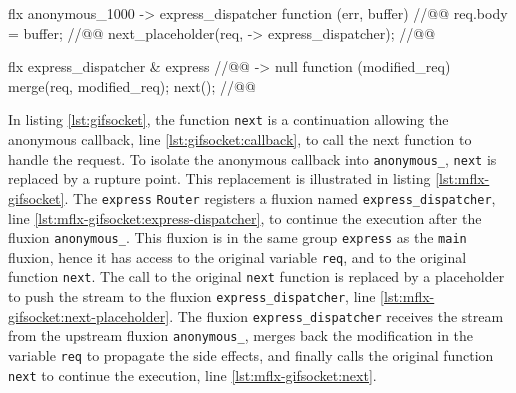 


\begin{code}[flx, caption={Simplified modification on the compiled result},label={lst:mflx-gifsocket}]
flx anonymous_1000
-> express_dispatcher
  function (err, buffer) { //@\label{lst:mflx-gifsocket:callback}@
    req.body = buffer; //@\label{lst:mflx-gifsocket:buffer}@
    next_placeholder(req, -> express_dispatcher); //@\label{lst:mflx-gifsocket:next-placeholder}@
  }

flx express_dispatcher & express //@\label{lst:mflx-gifsocket:express-dispatcher}@
-> null
  function (modified_req) {
    merge(req, modified_req);
    next(); //@\label{lst:mflx-gifsocket:next}@
  }
\end{code}

In listing \ref{lst:gifsocket}, the function \texttt{next} is a continuation allowing the anonymous callback, line \ref{lst:gifsocket:callback}, to call the next function to handle the request.
To isolate the anonymous callback into \texttt{anonymous\_}, \texttt{next} is replaced by a rupture point.
This replacement is illustrated in listing \ref{lst:mflx-gifsocket}.
The \texttt{express} \texttt{Router} registers a fluxion named \texttt{express\_\-dispatcher}, line \ref{lst:mflx-gifsocket:express-dispatcher}, to continue the execution after the fluxion \texttt{anonymous\_}.
This fluxion is in the same group \texttt{express} as the \texttt{main} fluxion, hence it has access to the original variable \texttt{req}, and to the original function \texttt{next}.
The call to the original \texttt{next} function 
is replaced by a placeholder to push the stream to the fluxion \texttt{express\_\-dispatcher}, line \ref{lst:mflx-gifsocket:next-placeholder}.
The fluxion \texttt{express\_\-dispatcher} receives the stream from the upstream fluxion \texttt{anonymous\_}, merges back the modification in the variable \texttt{req} to propagate the side effects, and finally calls the original function \texttt{next} to continue the execution, line \ref{lst:mflx-gifsocket:next}.




